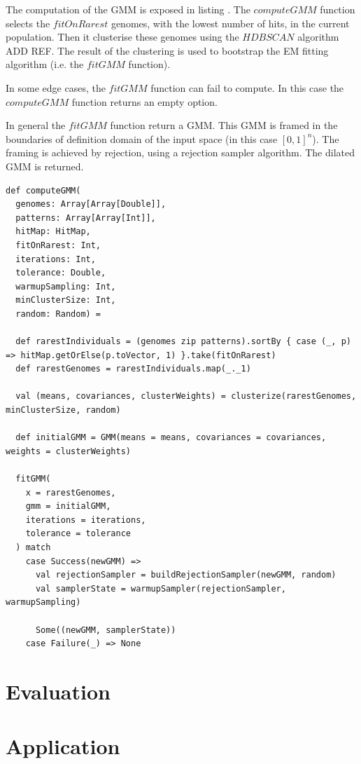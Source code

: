 \documentclass[10pt,a4paper]{article}
\theoremstyle{definition}
\theoremstyle{remark}
\begin{document}
The computation of the GMM is exposed in listing \label{lst:computeGMM}. The $computeGMM$ function selects the $fitOnRarest$ genomes,  with the lowest number of hits, in the current population. Then it clusterise these genomes using the $HDBSCAN$  algorithm {\color{red} ADD REF}. The result of the clustering is used to bootstrap the EM fitting algorithm (i.e. the $fitGMM$ function). 

In some edge cases, the $fitGMM$ function can fail to compute. In this case the $computeGMM$ function returns an empty option.

In general the $fitGMM$ function return a GMM. This GMM is framed in the boundaries of definition domain of the input space (in this case $[0,1]^n$). The framing is achieved by rejection, using a rejection sampler algorithm. The dilated GMM is returned.

\begin{lstlisting}[caption={Compute GMM},label={lst:computeGMM}]
def computeGMM(
  genomes: Array[Array[Double]],
  patterns: Array[Array[Int]],
  hitMap: HitMap,
  fitOnRarest: Int,
  iterations: Int,
  tolerance: Double,
  warmupSampling: Int,
  minClusterSize: Int,
  random: Random) =

  def rarestIndividuals = (genomes zip patterns).sortBy { case (_, p) => hitMap.getOrElse(p.toVector, 1) }.take(fitOnRarest)
  def rarestGenomes = rarestIndividuals.map(_._1)

  val (means, covariances, clusterWeights) = clusterize(rarestGenomes, minClusterSize, random)

  def initialGMM = GMM(means = means, covariances = covariances, weights = clusterWeights)

  fitGMM(
    x = rarestGenomes,
    gmm = initialGMM,
    iterations = iterations,
    tolerance = tolerance
  ) match
    case Success(newGMM) =>
      val rejectionSampler = buildRejectionSampler(newGMM, random)
      val samplerState = warmupSampler(rejectionSampler, warmupSampling)

      Some((newGMM, samplerState))
    case Failure(_) => None
\end{lstlisting}



\section{Evaluation}\label{sec. evaluation}



\section{Application}\label{sec. application}
\end{document}
